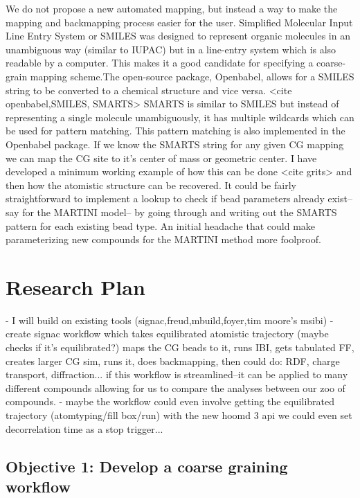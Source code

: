 We do not propose a new automated mapping, but instead a way to make the mapping and backmapping process easier for the user.
Simplified Molecular Input Line Entry System or SMILES \cite{Weininger} was designed to represent organic molecules in an unambiguous way (similar to IUPAC) but in a line-entry system which is also readable by a computer.
This makes it a good candidate for specifying a coarse-grain mapping scheme.The open-source package, Openbabel, allows for a SMILES string to be converted to a chemical structure and vice versa.
<cite openbabel,SMILES, SMARTS> SMARTS is similar to SMILES but instead of representing a single molecule unambiguously, it has multiple wildcards which can be used for pattern matching.
This pattern matching is also implemented in the Openbabel package.
If we know the SMARTS string for any given CG mapping we can map the CG site to it's center of mass or geometric center.
I have developed a minimum working example of how this can be done <cite grits> and then how the atomistic structure can be recovered.
It could be fairly straightforward to implement a lookup to check if bead parameters already exist--say for the MARTINI model-- by going through and writing out the SMARTS pattern for each existing bead type.
An initial headache that could make parameterizing new compounds for the MARTINI method more foolproof.

\section*{Research Plan}

- I will build on existing tools (signac,freud,mbuild,foyer,tim moore's msibi)
- create signac workflow which takes equilibrated atomistic trajectory (maybe checks if it's equilibrated?) maps the CG beads to it, runs IBI, gets tabulated FF, creates larger CG sim, runs it, does backmapping, then could do: RDF, charge transport, diffraction...
if this workflow is streamlined--it can be applied to many different compounds allowing for us to compare the analyses between our zoo of compounds.
- maybe the workflow could even involve getting the equilibrated trajectory (atomtyping/fill box/run) with the new hoomd 3 api we could even set decorrelation time as a stop trigger...

\subsection*{Objective 1: Develop a coarse graining workflow}

